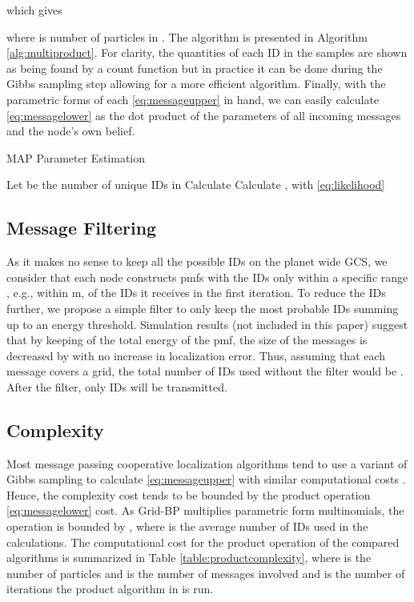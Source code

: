 \documentclass[10pt, final, journal]{IEEEtran}
\begin{document}
which gives

where  is number of particles  in . The algorithm is presented in Algorithm \ref{alg:multiproduct}. For clarity, the quantities of each ID in the samples are shown as being found by a count function but in practice it can be done during the Gibbs sampling step allowing for a more efficient algorithm. Finally, with the parametric forms of each \eqref{eq:messageupper} in hand, we can easily calculate \eqref{eq:messagelower} as the dot product of the  parameters of all incoming messages and the node's own belief.

\begin{algorithm}
\caption{MAP Parameter Estimation}
\begin{algorithmic}[1]
\label{alg:multiproduct}
\STATE Let  be the number of unique IDs in 
\STATE Calculate  
\FORALL {}
\STATE Calculate , with \eqref{eq:likelihood}
\ENDFOR
\RETURN
\end{algorithmic}
\end{algorithm}

\subsection{Message Filtering}\label{messagefiltering}
As it makes no sense to keep all the possible IDs on the planet wide GCS, we consider that each node constructs pmfs with the IDs only within a specific range , e.g., within m, of the IDs it receives in the first iteration. To reduce the IDs further, we propose a simple filter to only keep the most probable IDs summing up to an energy threshold. Simulation results (not included in this paper) suggest that by keeping  of the total energy of the pmf, the size of the messages is decreased by  with no increase in localization error. Thus, assuming that each message covers a  grid, the total number of IDs used without the filter would be . After the filter, only  IDs will be transmitted.

\subsection{Complexity}\label{complexity}
Most message passing cooperative localization algorithms tend to use a variant of Gibbs sampling to calculate \eqref{eq:messageupper} with similar computational costs \cite{Lien:2012bh}. Hence, the complexity cost tends to be bounded by the product operation \eqref{eq:messagelower} cost. As Grid-BP multiplies parametric form multinomials, the operation is bounded by , where  is the average number of IDs used in the calculations. The computational cost for the product operation of the compared algorithms is summarized in Table \ref{table:productcomplexity}, where  is the number of particles  and  is the number of messages involved and  is the number of iterations the product algorithm in \cite{Caceres:2011wx} is run.
\end{document}
